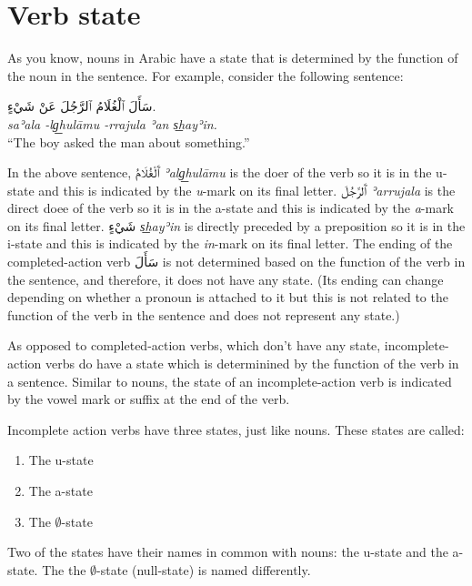 \documentclass[
  10pt,
]{book}
\providecommand{\tightlist}{%
  \setlength{\itemsep}{0pt}\setlength{\parskip}{0pt}}
\begin{document}
\section{Verb state}\label{verb-state}

As you know, nouns in Arabic have a state that is determined by the function of the noun in the sentence. For example, consider the following sentence:

\foreignlanguage{arabic}{سَأَلَ ٱلْغُلَامُ ٱلرَّجُلَ عَنْ شَيْءٍ.}\\
\emph{saʾala -lg͟hulāmu -rrajula ʾan s͟hayʾin.}\\
\enquote{The boy asked the man about something.}

In the above sentence, \foreignlanguage{arabic}{ٱَلْغُلَامُ} \emph{ʾalg͟hulāmu} is the doer of the verb so it is in the u-state and this is indicated by the \emph{u}-mark on its final letter.
\foreignlanguage{arabic}{ٱَلرَّجُلَ} \emph{ʾarrujala} is the direct doee of the verb so it is in the a-state and this is indicated by the \emph{a}-mark on its final letter.
\foreignlanguage{arabic}{شَيْءٍ} \emph{s͟hayʾin} is directly preceded by a preposition so it is in the i-state and this is indicated by the \emph{in}-mark on its final letter.
The ending of the completed-action verb \foreignlanguage{arabic}{سَأَلَ} is not determined based on the function of the verb in the sentence, and therefore, it does not have any state. (Its ending can change depending on whether a pronoun is attached to it but this is not related to the function of the verb in the sentence and does not represent any state.)

As opposed to completed-action verbs, which don't have any state, incomplete-action verbs do have a state which is determinined by the function of the verb in a sentence. Similar to nouns, the state of an incomplete-action verb is indicated by the vowel mark or suffix at the end of the verb.

Incomplete action verbs have three states, just like nouns. These states are called:

\begin{enumerate}
\def\labelenumi{\roman{enumi}.}
\tightlist
\item
  The u-state
\item
  The a-state
\item
  The \(\emptyset\)-state
\end{enumerate}

Two of the states have their names in common with nouns: the u-state and the a-state. The the \(\emptyset\)-state (null-state) is named differently.
\end{document}
